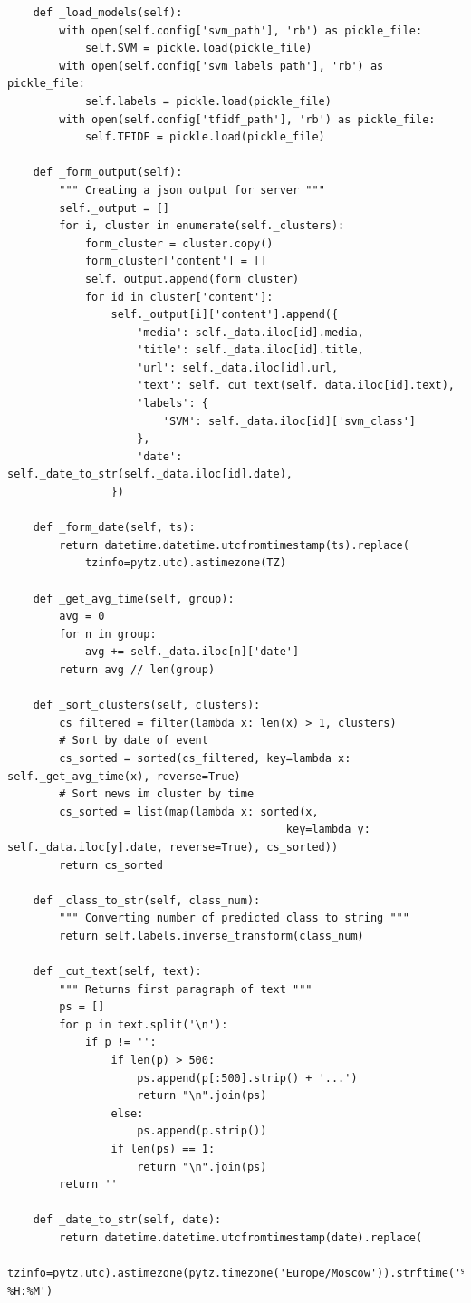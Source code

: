 \documentclass[a4paper, 14pt]{extarticle}
\begin{document}
\begin{verbatim}
    def _load_models(self):
        with open(self.config['svm_path'], 'rb') as pickle_file:
            self.SVM = pickle.load(pickle_file)
        with open(self.config['svm_labels_path'], 'rb') as pickle_file:
            self.labels = pickle.load(pickle_file)
        with open(self.config['tfidf_path'], 'rb') as pickle_file:
            self.TFIDF = pickle.load(pickle_file)

    def _form_output(self):
        """ Creating a json output for server """
        self._output = []
        for i, cluster in enumerate(self._clusters):
            form_cluster = cluster.copy()
            form_cluster['content'] = []
            self._output.append(form_cluster)
            for id in cluster['content']:
                self._output[i]['content'].append({
                    'media': self._data.iloc[id].media,
                    'title': self._data.iloc[id].title,
                    'url': self._data.iloc[id].url,
                    'text': self._cut_text(self._data.iloc[id].text),
                    'labels': {
                        'SVM': self._data.iloc[id]['svm_class']
                    },
                    'date': self._date_to_str(self._data.iloc[id].date),
                })

    def _form_date(self, ts):
        return datetime.datetime.utcfromtimestamp(ts).replace(
            tzinfo=pytz.utc).astimezone(TZ)

    def _get_avg_time(self, group):
        avg = 0
        for n in group:
            avg += self._data.iloc[n]['date']
        return avg // len(group)

    def _sort_clusters(self, clusters):
        cs_filtered = filter(lambda x: len(x) > 1, clusters)
        # Sort by date of event
        cs_sorted = sorted(cs_filtered, key=lambda x: self._get_avg_time(x), reverse=True)
        # Sort news im cluster by time
        cs_sorted = list(map(lambda x: sorted(x,
                                           key=lambda y: self._data.iloc[y].date, reverse=True), cs_sorted))
        return cs_sorted

    def _class_to_str(self, class_num):
        """ Converting number of predicted class to string """
        return self.labels.inverse_transform(class_num)

    def _cut_text(self, text):
        """ Returns first paragraph of text """
        ps = []
        for p in text.split('\n'):
            if p != '':
                if len(p) > 500:
                    ps.append(p[:500].strip() + '...')
                    return "\n".join(ps)
                else:
                    ps.append(p.strip())
                if len(ps) == 1:
                    return "\n".join(ps)
        return ''

    def _date_to_str(self, date):
        return datetime.datetime.utcfromtimestamp(date).replace(
            tzinfo=pytz.utc).astimezone(pytz.timezone('Europe/Moscow')).strftime('%a %H:%M')

	\end{verbatim}
\end{document}
